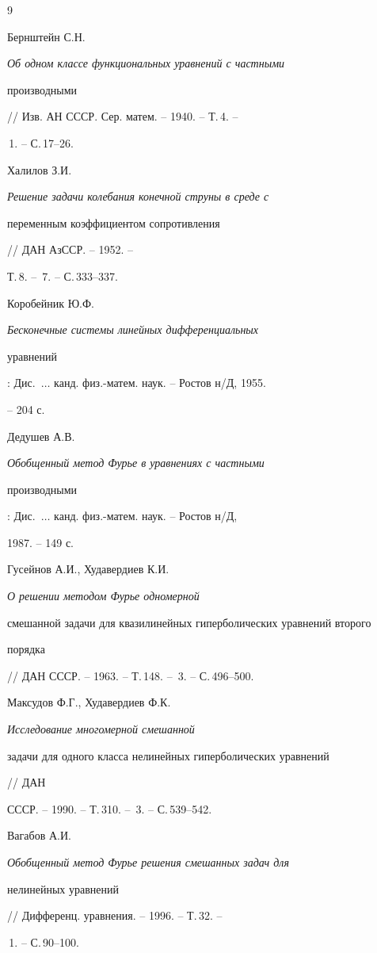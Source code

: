 \begin{thebibliography}{9} 


 




Бернштейн С.Н. {\em Об одном классе функциональных уравнений с частными 


производными} // Изв. АН СССР. Сер. матем. -- 1940. -- Т.\,4. -- 


\No\,1. -- С.\,17--26. 




Халилов З.И. {\em Решение задачи колебания конечной струны в среде с 


переменным коэффициентом сопротивления} // ДАН АзССР. -- 1952. -- 


Т.\,8. -- \No\,7. -- С.\,333--337. 




Коробейник Ю.Ф. {\em Бесконечные системы линейных дифференциальных 


уравнений}: Дис.~$\dotsc$ канд. физ.-матем. наук. -- Ростов н/Д, 1955. 


-- 204 с. 




Дедушев А.В. {\em Обобщенный метод Фурье в уравнениях с частными 


производными}: Дис.~$\dotsc$ канд. физ.-матем. наук. -- Ростов н/Д, 


1987. -- 149 с. 




Гусейнов А.И., Худавердиев К.И. {\em О решении методом Фурье одномерной 


смешанной задачи для квазилинейных гиперболических уравнений второго 


порядка} // ДАН СССР. -- 1963. -- Т.\,148. -- \No\,3. -- С.\,496--500. 




Максудов Ф.Г., Худавердиев Ф.К. {\em Исследование многомерной смешанной 


задачи для одного класса нелинейных гиперболических уравнений} // ДАН 


СССР. -- 1990. -- Т.\,310. -- \No\,3. -- С.\,539--542. 




Вагабов А.И. {\em Обобщенный метод Фурье решения смешанных задач для 


нелинейных уравнений} // Дифференц. уравнения. -- 1996. -- Т.\,32. -- 


\No\,1. -- С.\,90--100. 


 


\end{thebibliography} 


 


\vskip 0.5cm 


 








 


\label{end} 


 


